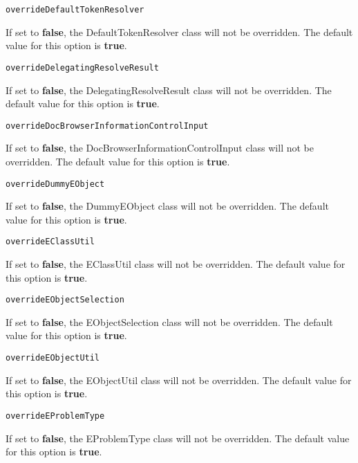 \noindent\texttt{overrideDefaultTokenResolver}
\begin{myindentpar}{1cm}
If set to \textbf{false}, the DefaultTokenResolver class will not be overridden. The default value for this option is \textbf{true}.
\end{myindentpar}

\noindent\texttt{overrideDelegatingResolveResult}
\begin{myindentpar}{1cm}
If set to \textbf{false}, the DelegatingResolveResult class will not be overridden. The default value for this option is \textbf{true}.
\end{myindentpar}

\noindent\texttt{overrideDocBrowserInformationControlInput}
\begin{myindentpar}{1cm}
If set to \textbf{false}, the DocBrowserInformationControlInput class will not be overridden. The default value for this option is \textbf{true}.
\end{myindentpar}

\noindent\texttt{overrideDummyEObject}
\begin{myindentpar}{1cm}
If set to \textbf{false}, the DummyEObject class will not be overridden. The default value for this option is \textbf{true}.
\end{myindentpar}

\noindent\texttt{overrideEClassUtil}
\begin{myindentpar}{1cm}
If set to \textbf{false}, the EClassUtil class will not be overridden. The default value for this option is \textbf{true}.
\end{myindentpar}

\noindent\texttt{overrideEObjectSelection}
\begin{myindentpar}{1cm}
If set to \textbf{false}, the EObjectSelection class will not be overridden. The default value for this option is \textbf{true}.
\end{myindentpar}

\noindent\texttt{overrideEObjectUtil}
\begin{myindentpar}{1cm}
If set to \textbf{false}, the EObjectUtil class will not be overridden. The default value for this option is \textbf{true}.
\end{myindentpar}

\noindent\texttt{overrideEProblemType}
\begin{myindentpar}{1cm}
If set to \textbf{false}, the EProblemType class will not be overridden. The default value for this option is \textbf{true}.
\end{myindentpar}

